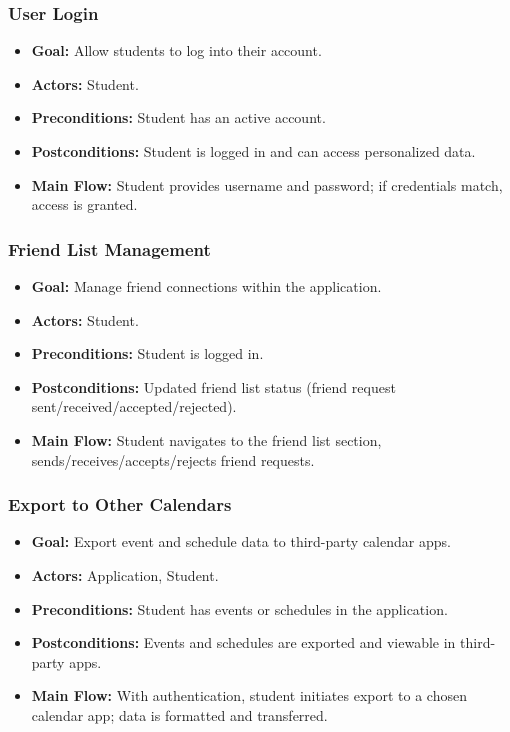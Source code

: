 \documentclass[12pt]{article}
\begin{document}
\subsubsection{User Login}
\begin{itemize}
    \item \textbf{Goal:} Allow students to log into their account.
    \item \textbf{Actors:} Student.
    \item \textbf{Preconditions:} Student has an active account.
    \item \textbf{Postconditions:} Student is logged in and can access personalized data.
    \item \textbf{Main Flow:} Student provides username and password; if credentials match, access is granted.
\end{itemize}

\subsubsection{Friend List Management}
\begin{itemize}
    \item \textbf{Goal:} Manage friend connections within the application.
    \item \textbf{Actors:} Student.
    \item \textbf{Preconditions:} Student is logged in.
    \item \textbf{Postconditions:} Updated friend list status (friend request sent/received/accepted/rejected).
    \item \textbf{Main Flow:} Student navigates to the friend list section, sends/receives/accepts/rejects friend requests.
\end{itemize}

\subsubsection{Export to Other Calendars}
\begin{itemize}
    \item \textbf{Goal:} Export event and schedule data to third-party calendar apps.
    \item \textbf{Actors:} Application, Student.
    \item \textbf{Preconditions:} Student has events or schedules in the application.
    \item \textbf{Postconditions:} Events and schedules are exported and viewable in third-party apps.
    \item \textbf{Main Flow:} With authentication, student initiates export to a chosen calendar app; data is formatted and transferred.
\end{itemize}
\end{document}
